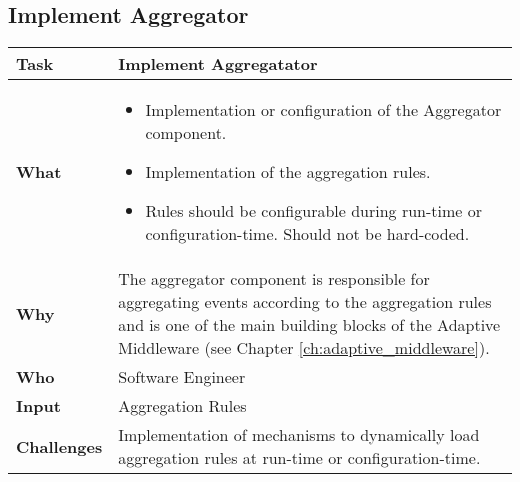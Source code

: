 \subsection{Implement Aggregator}
\begin{minipage}{\textwidth}
 \label{table:ch6_Task_Implement_Aggregator}
\begin{tabular}
	{|m{3cm}|m{10cm}|} \hline \bfseries Task & Implement Aggregatator\\
	\hline \bfseries What & 
	\begin{itemize}
		\item Implementation or configuration of the Aggregator component.
		\item Implementation of the aggregation rules.
		\item Rules should be configurable during run-time or configuration-time. Should not be hard-coded.
	\end{itemize}
	\\
	\hline \bfseries Why & The aggregator component is responsible for aggregating events according to the aggregation rules and is one of the main building blocks of the Adaptive Middleware (see Chapter \ref{ch:adaptive_middleware}).\\
	\hline \bfseries Who & Software Engineer\\
	\hline \bfseries Input & Aggregation Rules\\
	\hline \bfseries Challenges & Implementation of mechanisms to dynamically load aggregation rules at run-time or configuration-time.\\
	\hline 
\end{tabular}
\end{minipage}

